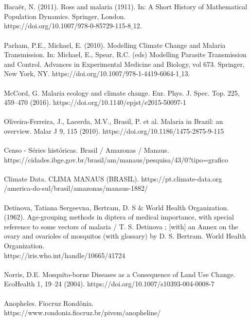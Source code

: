 \documentclass[12pt]{article}
\begin{document}
\\\\
\noindent [8] Bacaër, N. (2011). Ross and malaria (1911). In: A Short History of Mathematical Population Dynamics. Springer, London. \\ https://doi.org/10.1007/978-0-85729-115-8$\_$12.
\\\\
\noindent [9] Parham, P.E., Michael, E. (2010). Modelling Climate Change and Malaria Transmission. In: Michael, E., Spear, R.C. (eds) Modelling Parasite Transmission and Control. Advances in Experimental Medicine and Biology, vol 673. Springer, New York, NY. https://doi.org/10.1007/978-1-4419-6064-1$\_$13.
\\\\
\noindent [10] McCord, G. Malaria ecology and climate change. Eur. Phys. J. Spec. Top. 225, 459–470 (2016). https://doi.org/10.1140/epjst/e2015-50097-1
\\\\
\noindent [11] Oliveira-Ferreira, J., Lacerda, M.V., Brasil, P. et al. Malaria in Brazil: an overview. Malar J 9, 115 (2010). https://doi.org/10.1186/1475-2875-9-115
\\\\
\noindent [12] Censo - Séries históricas. Brasil / Amazonas / Manaus. 
\\https://cidades.ibge.gov.br/brasil/am/manaus/pesquisa/43/0?tipo=grafico
\\\\
\noindent [13] Climate Data. CLIMA MANAUS (BRASIL). https://pt.climate-data.org \\ /america-do-sul/brasil/amazonas/manaus-1882/
\\\\
\noindent [14] Detinova, Tatiana Sergeevna, Bertram, D. S $\&$ World Health Organization. (1962). Age-grouping methods in diptera of medical importance, with special reference to some vectors of malaria / T. S. Detinova ; [with] an Annex on the ovary and ovarioles of mosquitos (with glossary) by D. S. Bertram. World Health Organization. \\ https://iris.who.int/handle/10665/41724
\\\\
\noindent [15] Norris, D.E. Mosquito-borne Diseases as a Consequence of Land Use Change. EcoHealth 1, 19–24 (2004). https://doi.org/10.1007/s10393-004-0008-7
\\\\
\noindent [16] Anopheles. Fiocruz Rondônia. \\ https://www.rondonia.fiocruz.br/pivem/anopheline/
\end{document}

